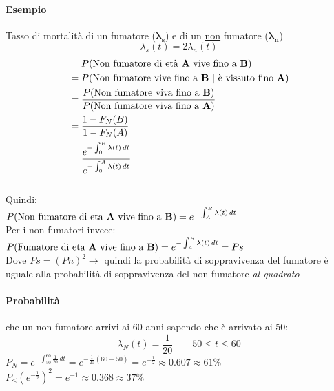 \documentclass[]{article}
\begin{document}
    \paragraph{Esempio} Tasso di mortalità di un fumatore ($\mathbf{\lambda_s}$) e di un \underline{non} fumatore ($\mathbf{\lambda_n}$)
    \[ \lambda_s(t) = 2 \lambda_n (t) \]
    \begin{equation*}
        \begin{split}
            &= P(\text{Non fumatore di età \textbf{A} vive fino a \textbf{B}}) \\
            &=P(\text{Non fumatore vive fino a \textbf{B} | è vissuto fino \textbf{A}}) \\
            &= \frac{P(\text{Non fumatore viva fino a \textbf{B}})}{P(\text{Non fumatore viva fino a \textbf{A}})} \\
            &= \frac{1 - F_N(B)}{1 - F_N(A)} \\
            &= \frac{e^{-\int_{0}^{B} \lambda (t) \, dt}}{e^{-\int_{0}^{A} \lambda(t) \, dt}}
        \end{split}
    \end{equation*} \\[2ex]
    Quindi: \\
    $\displaystyle P(\text{Non fumatore di eta \textbf{A} vive fino a \textbf{B}}) = e^{-\int_{A}^{B} \lambda(t) \, dt}$ \\[3ex]
    Per i non fumatori invece: \\
    $\displaystyle P(\text{Fumatore di eta \textbf{A} vive fino a \textbf{B}}) = e^{-\int_{A}^{B} \lambda(t) \, dt} = Ps$ \\[2ex]
    Dove $Ps = (Pn)^2 \rightarrow$ quindi la probabilità di soppravivenza del fumatore è uguale alla probabilità di soppravivenza del non fumatore \textit{al quadrato}
    \paragraph{Probabilità} che un non fumatore arrivi ai 60 anni sapendo che è arrivato ai 50: \\
    \[ \lambda_N(t) = \frac{1}{20} \qquad 50 \leq t \leq 60 \]
    $ P_N = e^{-\int_{50}^{60} \frac{1}{20} \, dt } = e^{-\frac{1}{20}(60-50)} = e^{-\frac{1}{2}} \approx 0.607 \approx 61\%$ \\
    $P_\leq (e^{-\frac{1}{2}})^2 = e^{-1} \approx 0.368 \approx 37\%$
\end{document}

